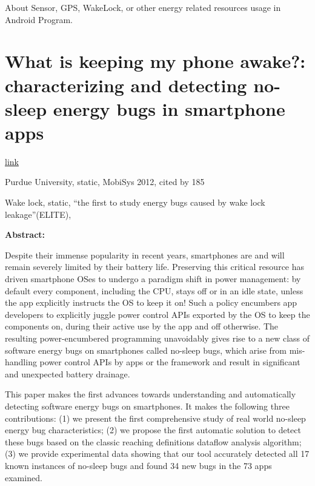 \documentclass{article}
\begin{document}
About Sensor, GPS, WakeLock, or other energy related resources usage in Android Program.

\section{What is keeping my phone awake?: characterizing and detecting no-sleep
  energy bugs in smartphone apps}

\href{http://dl.acm.org/citation.cfm?id=2307661}{link}

Purdue University, static, MobiSys 2012, cited by 185

Wake lock, static, ``the first to study energy bugs caused by wake lock
leakage''(ELITE),



\textbf{Abstract:}

Despite their immense popularity in recent years, smartphones are and will
remain severely limited by their battery life. Preserving this critical resource
has driven smartphone OSes to undergo a paradigm shift in power management: by
default every component, including the CPU, stays off or in an idle state,
unless the app explicitly instructs the OS to keep it on! Such a policy
encumbers app developers to explicitly juggle power control APIs exported by the
OS to keep the components on, during their active use by the app and off
otherwise. The resulting power-encumbered programming unavoidably gives rise to
a new class of software energy bugs on smartphones called no-sleep bugs, which
arise from mis-handling power control APIs by apps or the framework and result
in significant and unexpected battery drainage.

This paper makes the first advances towards understanding and automatically
detecting software energy bugs on smartphones. It makes the following three
contributions: (1) we present the first comprehensive study of real world
no-sleep energy bug characteristics; (2) we propose the first automatic solution
to detect these bugs based on the classic reaching definitions dataflow analysis
algorithm; (3) we provide experimental data showing that our tool accurately
detected all 17 known instances of no-sleep bugs and found 34 new bugs in the 73
apps examined.
\end{document}
